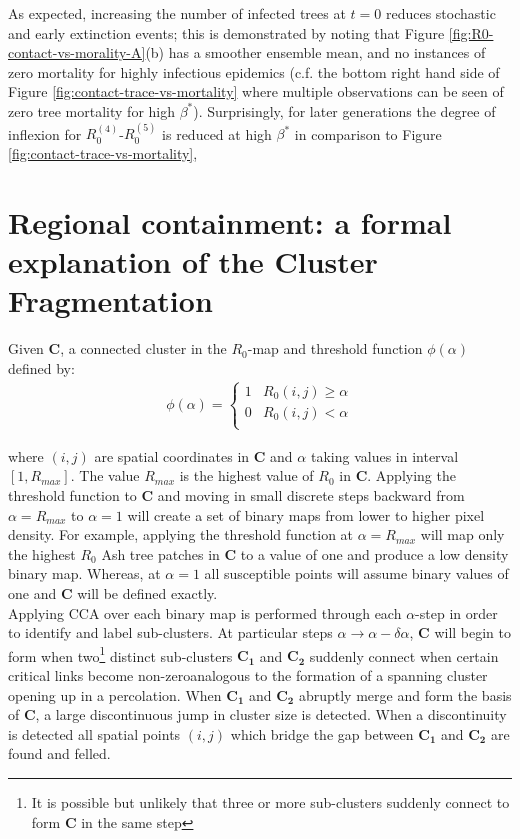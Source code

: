 As expected, increasing the number of infected trees at $t=0$ reduces stochastic and early extinction events;
this is demonstrated by noting that Figure \ref{fig:R0-contact-vs-morality-A}(b) has a smoother ensemble mean, and no instances of zero mortality for highly infectious epidemics (c.f. the bottom right hand side of Figure \ref{fig:contact-trace-vs-mortality} where multiple observations can be seen of zero tree mortality for high $\beta^*$).
Surprisingly, for later generations the degree of inflexion for $R_0^{(4)}$-$R_0^{(5)}$ is reduced at high $\beta^*$ in comparison to Figure \ref{fig:contact-trace-vs-mortality},

\newpage

\chapter{Regional containment: a formal explanation of the Cluster Fragmentation}
\label{section:alpha-step}
Given $\mathbf{C}$, a connected cluster in the $R_0$-map and threshold function $\phi(\alpha)$ defined by:
\begin{align}
\label{eq:alpha-step}
\phi(\alpha) = \left\{ \begin{array}{cc} 
                1 & R_0(i, j) \geq \alpha \\
                0 & R_0(i, j) < \alpha \\
                \end{array} \right.
\end{align}

where $(i,j)$ are spatial coordinates in $\mathbf{C}$ and $\alpha$ taking values in interval $[1, R_{max}]$. The value $R_{max}$ is the highest value of $R_0$ in $\mathbf{C}$. Applying the threshold function to $\mathbf{C}$ and moving in small discrete steps backward from $\alpha = R_{max}$ to $\alpha=1$ will create a set of binary maps from lower to higher pixel density. For example, applying the threshold function at $\alpha = R_{max}$ will map only the highest $R_0$ Ash tree patches in $\mathbf{C}$ to a value of one and produce a low density binary map. Whereas, at $\alpha=1$ all susceptible points will assume binary values of one and $\mathbf{C}$ will be defined exactly.\\

Applying CCA over each binary map is performed through each $\alpha$-step in order to identify and label sub-clusters. At particular steps $\alpha \rightarrow \alpha - \delta\alpha$, $\mathbf{C}$ will begin to form when two\footnote{It is possible but unlikely that three or more sub-clusters suddenly connect to form $\mathbf{C}$ in the same step} distinct sub-clusters $\mathbf{C_1}$ and $\mathbf{C_2}$ suddenly connect when certain critical links become non-zero\textemdash analogous to the formation of a spanning cluster opening up in a percolation. When $\mathbf{C_1}$ and $\mathbf{C_2}$ abruptly merge and form the basis of $\mathbf{C}$, a large discontinuous jump in cluster size is detected. When a discontinuity is detected all spatial points $(i,j)$ which bridge the gap between $\mathbf{C_1}$ and $\mathbf{C_2}$ are found and felled.\\


